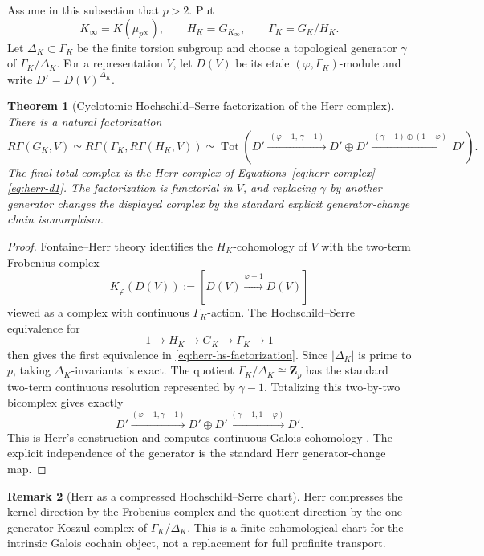 \documentclass[11pt]{article}
\newtheorem{theorem}{Theorem}[section]
\theoremstyle{definition}
\newtheorem{remark}[theorem]{Remark}
\newcommand{\Tot}{\operatorname{Tot}}
\begin{document}
Assume in this subsection that $p>2$.  Put
\[
 K_\infty=K(\mu_{p^\infty}),
 \qquad
 H_K=G_{K_\infty},
 \qquad
 \Gamma_K=G_K/H_K.
\]
Let $\Delta_K\subset\Gamma_K$ be the finite torsion subgroup and choose a topological generator $\gamma$ of $\Gamma_K/\Delta_K$.  For a representation $V$, let $D(V)$ be its etale $(\varphi,\Gamma_K)$-module and write $D'=D(V)^{\Delta_K}$.

\begin{theorem}[Cyclotomic Hochschild--Serre factorization of the Herr complex]\label{thm:herr-hochschild-serre}
There is a natural factorization
\begin{equation}\label{eq:herr-hs-factorization}
 R\Gamma(G_K,V)
 \simeq
 R\Gamma\!\left(
 \Gamma_K,
 R\Gamma(H_K,V)
 \right)
 \simeq
 \Tot\!\left(
 D'
 \xrightarrow{\ (\varphi-1,\,\gamma-1)\ }
 D'\oplus D'
 \xrightarrow{\ (\gamma-1)\oplus(1-\varphi)\ }
 D'
 \right).
\end{equation}
The final total complex is the Herr complex of Equations~\eqref{eq:herr-complex}--\eqref{eq:herr-d1}.  The factorization is functorial in $V$, and replacing $\gamma$ by another generator changes the displayed complex by the standard explicit generator-change chain isomorphism.
\end{theorem}

\begin{proof}
Fontaine--Herr theory identifies the $H_K$-cohomology of $V$ with the two-term Frobenius complex
\[
 K_\varphi(D(V))
 :=
 [D(V)\xrightarrow{\varphi-1}D(V)]
\]
viewed as a complex with continuous $\Gamma_K$-action.  The Hochschild--Serre equivalence for
\[
1\longrightarrow H_K\longrightarrow G_K\longrightarrow\Gamma_K\longrightarrow1
\]
then gives the first equivalence in \eqref{eq:herr-hs-factorization}.  Since $|\Delta_K|$ is prime to $p$, taking $\Delta_K$-invariants is exact.  The quotient $\Gamma_K/\Delta_K\cong\mathbf Z_p$ has the standard two-term continuous resolution represented by $\gamma-1$.  Totalizing this two-by-two bicomplex gives exactly
\[
D'\xrightarrow{(\varphi-1,\gamma-1)}D'\oplus D'
\xrightarrow{(\gamma-1,1-\varphi)}D'.
\]
This is Herr's construction and computes continuous Galois cohomology \cite{HerrSurvey,LiuCohomology,KPXFamilies}.  The explicit independence of the generator is the standard Herr generator-change map.
\end{proof}

\begin{remark}[Herr as a compressed Hochschild--Serre chart]\label{rem:herr-wall-compression}
Herr compresses the kernel direction by the Frobenius complex and the quotient direction by the one-generator Koszul complex of $\Gamma_K/\Delta_K$.  This is a finite cohomological chart for the intrinsic Galois cochain object, not a replacement for full profinite transport.
\end{remark}
\end{document}
